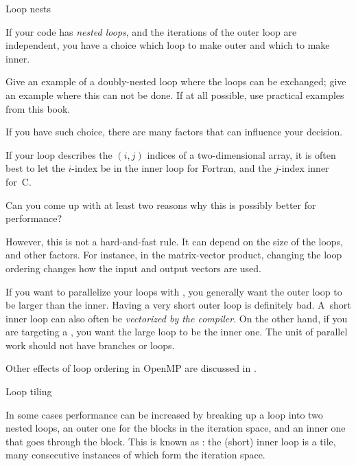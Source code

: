  {Loop nests}

If your code has \emph{nested loops}, and the iterations of the outer
loop are independent, you have a choice which loop to make outer and
which to make inner.

\begin{exercise}
  Give an example of a doubly-nested loop where the loops can be
  exchanged; give an example where this can not be done. If at all
  possible, use practical examples from this book.
\end{exercise}

If you have such choice, there are many factors that can influence
your decision.

%
If your loop describes the $(i,j)$ indices of a two-dimensional array,
it is often best to let the $i$-index be in the inner loop for
Fortran, and the $j$-index inner for~C.

\begin{exercise}
  Can you come up with at least two reasons why this is possibly better for performance?
\end{exercise}

However, this is not a hard-and-fast rule. It can depend on the size
of the loops, and other factors. For instance, in the matrix-vector
product, changing the loop ordering changes how the input and output
vectors are used.


%
If you want to parallelize your loops with , you
generally want the outer loop to be larger than the inner. Having a
very short outer loop is definitely bad. A~short inner loop can also
often be \emph{vectorized by the
  compiler}.
On the other hand, if you are targeting a , you want the
large loop to be the inner one. The unit of parallel work should not have branches
or loops.

Other effects of loop ordering in OpenMP are discussed in .


 {Loop tiling}
\label{sec:loop-tiling}

In some cases performance can be increased by breaking up a loop into
two nested loops, an outer one for the blocks in the iteration space,
and an inner one that goes through the block. This is known as
: the (short) inner loop is a tile, many
consecutive instances of which form the iteration space.

